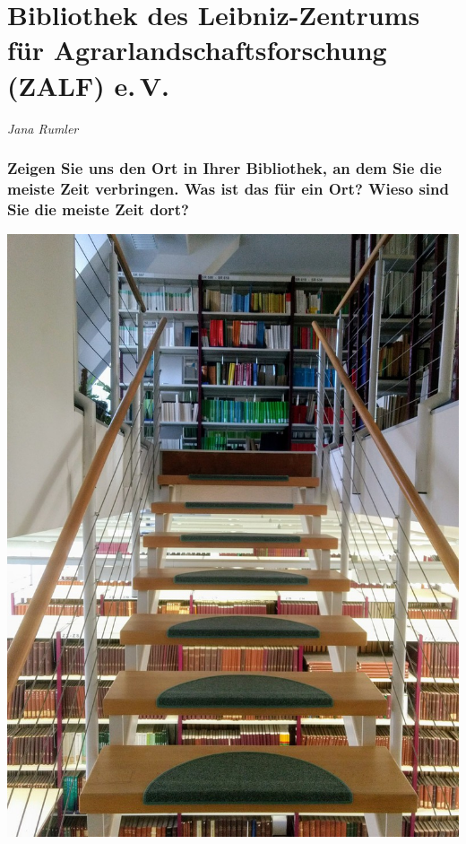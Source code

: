 
\vspace*{.5cm}
\section{Bibliothek des Leibniz-Zentrums für Agrarlandschaftsforschung (ZALF) e.\,V.}
\begin{center}
\emph{Jana Rumler}
\end{center}
\vspace*{1cm}
\hypertarget{zeigen-sie-uns-den-ort-in-ihrer-bibliothek-an-dem-sie-die-meiste-zeit-verbringen.-was-ist-das-fuxfcr-ein-ort-wieso-sind-sie-die-meiste-zeit-dort}{%
\subsubsection*{Zeigen Sie uns den Ort in Ihrer Bibliothek, an dem Sie die
meiste Zeit verbringen. Was ist das für ein Ort? Wieso sind Sie die
meiste Zeit
dort?}\label{zeigen-sie-uns-den-ort-in-ihrer-bibliothek-an-dem-sie-die-meiste-zeit-verbringen.-was-ist-das-fuxfcr-ein-ort-wieso-sind-sie-die-meiste-zeit-dort}}

\begin{center}
\includegraphics{zalf/img/treppe.jpg}
\end{center}

